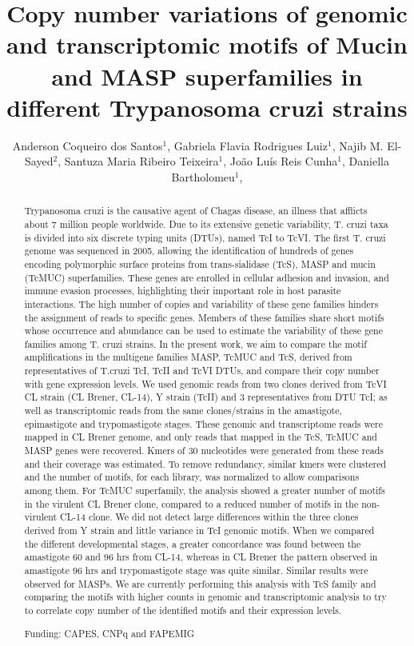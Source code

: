 \documentclass[twoside]{article}
\title{\vspace{-15mm}\fontsize{24pt}{10pt}\selectfont\textbf{ Copy number variations of genomic and transcriptomic motifs of Mucin and MASP superfamilies in different Trypanosoma cruzi strains }} %
\author{ Anderson Coqueiro dos Santos$^{1}$, Gabriela Flavia Rodrigues Luiz$^{1}$, Najib M. El-Sayed$^{2}$, Santuza Maria Ribeiro Teixeira$^{1}$, João Luís Reis Cunha$^{1}$, Daniella Bartholomeu$^{1}$, }
\affil{ 1 Institute of Biological Sciences, UFMG

2 Department of Parasite Genomics, Institute for Genomic Research

 }
\date{}
\begin{document}
  
  
  \maketitle %
  
  
  \thispagestyle{fancy} %
  
  
  \begin{abstract}
  Trypanosoma cruzi is the causative agent of Chagas disease, an illness that afflicts about 7 million people worldwide. Due to its extensive genetic variability, T. cruzi taxa is divided into six discrete typing units (DTUs), named TcI to TcVI. The first T. cruzi genome was sequenced in 2005, allowing the identification of hundreds of genes encoding polymorphic surface proteins from trans-sialidase (TcS), MASP and mucin (TcMUC) superfamilies. These genes are enrolled in cellular adhesion and invasion, and immune evasion processes, highlighting their important role in host parasite interactions.  The high number of copies and variability of these gene families hinders the assignment of reads to specific genes. Members of these families share short motifs whose occurrence and abundance can be used to estimate the variability of these gene families among T. cruzi strains. In the present work, we aim to compare the motif amplifications in the multigene families MASP, TcMUC and TcS, derived from representatives of T.cruzi TcI, TcII and TcVI DTUs, and compare their copy number with gene expression levels. We used genomic reads from two clones derived from TcVI CL strain (CL Brener, CL-14), Y strain (TcII) and 3 representatives from DTU TcI; as well as transcriptomic reads from the same clones/strains in the amastigote, epimastigote and trypomastigote stages. These genomic and transcriptome reads were mapped in CL Brener genome, and only reads that mapped in the TcS, TcMUC and MASP genes were recovered. Kmers of 30 nucleotides were generated from these reads and their coverage was estimated. To remove redundancy, similar kmers were clustered and the number of motifs, for each library, was normalized to allow comparisons among them. For TcMUC superfamily, the analysis showed a greater number of motifs in the virulent CL Brener clone, compared to a reduced number of motifs in the non-virulent CL-14 clone. We did not detect large differences within the three clones derived from Y strain and little variance in TcI genomic motifs. When we compared the different developmental stages, a greater concordance was found between the amastigote 60 and 96 hrs from CL-14, whereas in CL Brener the pattern observed in amastigote 96 hrs and trypomastigote stage was quite similar. Similar results were observed for MASPs. We are currently performing this analysis with TcS family and comparing the motifs with higher counts in genomic and transcriptomic analysis to try to correlate copy number of the identified motifs and their expression levels.
  
  Funding: CAPES, CNPq and FAPEMIG \\ 
  \end{abstract}
  
\end{document}
